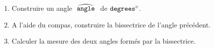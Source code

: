 \documentclass[exercice]{thedocument}%
\begin{document}
%
    \begin{enumerate}
        \item Construire un angle $\widehat{\mathspoint{\<angle;}}$
        de $\<degrees;^\circ$.
        \item A l'aide du compas, construire la bissectrice
        de l'angle précédent.
        \item Calculer la mesure des deux angles formés par la
        bissectrice.
    \end{enumerate}
\end{document}
